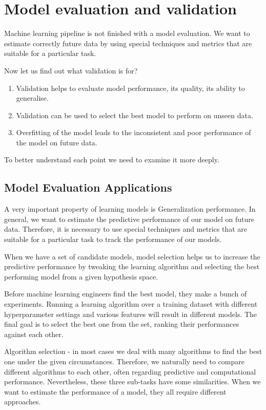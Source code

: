 \section{Model evaluation and validation} \label{sect1_4}
Machine learning pipeline is not finished with a model evaluation. We want to estimate correctly future data by using special techniques and metrics that are suitable for a particular task.

Now let us find out what validation is for?
\begin{enumerate}
	\item Validation helps to evaluate model performance, its quality, its ability to generalise.
	\item Validation can be used to select the best model to perform on unseen data.
	\item Overfitting of the model leads to the inconsistent and poor performance of the model on future data.
\end{enumerate}

To better understand each point we need to examine it more deeply.

\subsection{Model Evaluation Applications}
A very important property of learning models is Generalization performance. In general, we want to estimate the predictive performance of our model on future data.  Therefore, it is necessary to use special techniques and metrics that are suitable for a particular task to track the performance of our models. 

When we have a set of candidate models, model selection helps us to increase the predictive performance by tweaking the learning algorithm and selecting the best performing model from a given hypothesis space.
 
Before machine learning engineers find the best model, they make a bunch of experiments. Running a learning algorithm over a training dataset with different hyperparameter settings and various features will result in different models. The final goal is to select the best one from the set, ranking their performances against each other.

Algorithm selection - in most cases we deal with many algorithms to find the best one under the given circumstances. Therefore, we naturally need to compare different algorithms to each other, often regarding predictive and computational performance.
Nevertheless, these three sub-tasks have some similarities. When we want to estimate the performance of a model, they all require different approaches.


